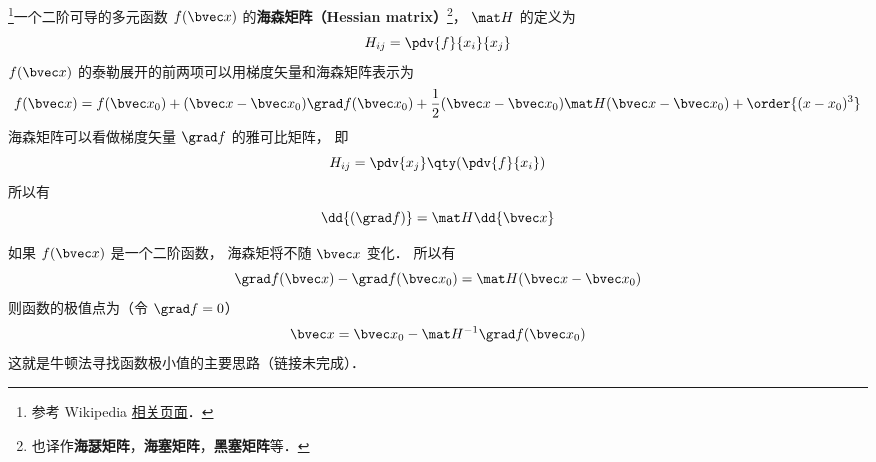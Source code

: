
\begin{issues}
\issueDraft
\end{issues}


\footnote{参考 Wikipedia \href{https://en.wikipedia.org/wiki/Hessian_matrix}{相关页面}．}一个二阶可导的多元函数 $f(\bvec x)$ 的\textbf{海森矩阵（Hessian matrix）}\footnote{也译作\textbf{海瑟矩阵}，\textbf{海塞矩阵}，\textbf{黑塞矩阵}等．}， $\mat H$ 的定义为
\begin{equation}
H_{ij} = \pdv{f}{x_i}{x_j}
\end{equation}
$f(\bvec x)$ 的泰勒展开的前两项可以用梯度矢量和海森矩阵表示为
\begin{equation}
f(\bvec x) = f(\bvec x_0) + (\bvec x - \bvec x_0) \grad f(\bvec x_0) + \frac12(\bvec x - \bvec x_0) \mat H (\bvec x - \bvec x_0) + \order{(x-x_0)^3}
\end{equation}
海森矩阵可以看做梯度矢量 $\grad f$ 的雅可比矩阵， 即
\begin{equation}
H_{ij} = \pdv{x_j} \qty(\pdv{f}{x_i})
\end{equation}
所以有
\begin{equation}
\dd{(\grad f)} = \mat H \dd{\bvec x}
\end{equation}

如果 $f(\bvec x)$ 是一个二阶函数， 海森矩将不随 $\bvec x$ 变化． 所以有
\begin{equation}
\grad f(\bvec x) - \grad f(\bvec x_0) = \mat H (\bvec x - \bvec x_0)
\end{equation}
则函数的极值点为（令 $\grad f = 0$）
\begin{equation}
\bvec x = \bvec x_0 - \mat H^{-1} \grad f(\bvec x_0)
\end{equation}
这就是牛顿法寻找函数极小值的主要思路（链接未完成）．
